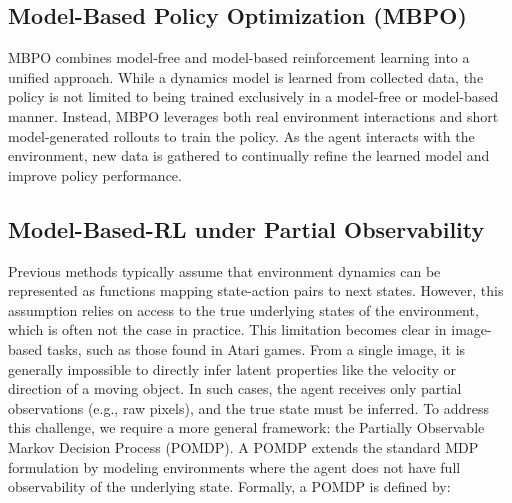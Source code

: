 \subsection{Model-Based Policy Optimization (MBPO)}
MBPO \cite{janner2021trustmodelmodelbasedpolicy} combines model-free and model-based reinforcement learning into a unified 
approach. While a dynamics model is learned from collected data, the policy is not limited to being trained exclusively in a 
model-free or model-based manner. Instead, MBPO leverages both real environment interactions and short model-generated rollouts 
to train the policy. As the agent interacts with the environment, new data is gathered to continually refine the learned model 
and improve policy performance.

\subsection{Model-Based-RL under Partial Observability}
Previous methods typically assume that environment dynamics can be represented as functions mapping state-action pairs to next 
states. However, this assumption relies on access to the true underlying states of the environment, which is often not the case 
in practice.\newline
This limitation becomes clear in image-based tasks, such as those found in Atari games. From a single image, 
it is generally impossible to directly infer latent properties like the velocity or direction of a moving object. In such cases,
the agent receives only partial observations (e.g., raw pixels), and the true state must be inferred.\newline
To address this challenge, we require a more general framework: the Partially Observable Markov Decision Process (POMDP). A POMDP 
extends the standard MDP formulation by modeling environments where the agent does not have full observability of the underlying 
state. Formally, a POMDP is defined by:

